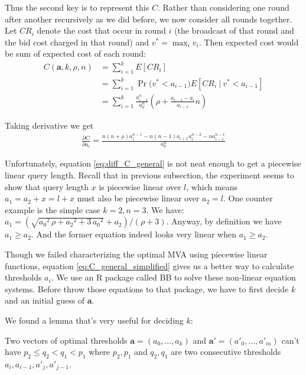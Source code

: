 Thus the second key is to represent this $C$. Rather than
considering one round after another recursively as we did before, we now consider all
rounds together. Let $CR_i$ denote the cost that occur in round $i$ (the broadcast
of that round and the bid cost charged in that round) and $v^* = \max_i v_i$. Then expected cost
would be sum of expected cost of each round:
\begin{align}
C(\boldsymbol a, k, \rho, n) &= \sum_{i=1}^k E[ CR_i ] \nonumber \\
  &= \sum_{i=1}^{k} \Pr\big( v^* < a_{i-1} \big) E[CR_i ~|~ v^* < a_{i-1}] \nonumber \\
  &= \sum_{i=1}^{k} \frac{a_{i-1}^n}{a_0^n} \left( \rho + \frac{a_{i-1}-a_{i}}{a_{i-1}} n \right)
  \label{eq:C_general_simplified}
\end{align}

Taking derivative we get
\begin{align}
 \frac{\partial C}{\partial a_i} = \frac{
	n(n+\rho)a_i^{n-1}-n(n-1)a_{i+1}a_i^{n-2}-n a_{i-1}^{n-1} }{a_0^n}
	\label{eq:diff_C_general}
\end{align}

Unfortunately, equation
\ref{eq:diff_C_general} is not neat enough to get a piecewise linear query length.
Recall that in previous subsection, the experiment seems to show that query length $x$ is
piecewise linear over $l$, which means $a_1 = a_2+x = l+x$ must also be
piecewise linear over $a_2 = l$.  One counter example is the simple case $k =
2, n = 3$. We have: $a_1 =
(\sqrt{{a_0}^{2}\,\rho+{a_2}^{2}+3\,{a_0}^{2}}+a_2)/(\rho+3)$.  Anyway, by
definition we have $a_1 \geq a_2$. And the former equation indeed looks very
linear when $a_1 \geq a_2$.

Though we failed characterizing the optimal MVA using piecewise linear
functions, equation \ref{eq:C_general_simplified} gives us a better way to
calculate thresholds $a_i$. We use an R package called BB \cite{Varadhan2009:BB} to
solve these non-linear equation systems. Before throw those equations to that
package, we have to first decide $k$ and an initial guess of $\boldsymbol a$.

We found a lemma that's very useful for deciding $k$:

\begin{lemma}\label{lemma:thresholds}
Two vectors of optimal thresholds $\boldsymbol a = (a_0, \ldots, a_k)$ and
$\boldsymbol a' = (a'_0, \ldots, a'_m)$ can't have $p_2 \leq q_2 < q_1 < p_1$
where $p_2, p_1$ and $q_2, q_1$ are two consecutive thresholds $a_i, a_{i-1},
a'_j, a'_{j-1}$.
\end{lemma}

